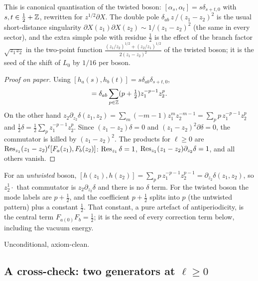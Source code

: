 \begin{physics}
This is canonical quantisation of the twisted boson: $[\alpha_s,\alpha_t]=s\delta_{s+t,0}$ with $s,t\in\tfrac12+{\mathbb{Z}}$, rewritten for $z^{1/2}\partial X$. The double pole $\delta_{ab}\,z\,/(z_1-z_2)^2$ is the usual short-distance singularity $\partial X(z_1)\partial X(z_2)\sim1/(z_1-z_2)^2$ (the same in every sector), and the extra simple pole with residue $\tfrac12$ is the effect of the branch factor $\sqrt{z_1z_2}$ in the two-point function $\frac{(z_1/z_2)^{1/2}+(z_2/z_1)^{1/2}}{2(z_1-z_2)^2}$ of the twisted boson; it is the seed of the shift of $L_0$ by $1/16$ per boson.
\end{physics}

\begin{proof}[Proof on paper]
Using $[h_a(s),h_b(t)] = s\delta_{ab}\delta_{s+t,0}$,
\begin{equation*}
  [F_a(z_1),F_b(z_2)] = \delta_{ab}\sum_{p\in\Z}(p+\tfrac12)z_1^{-p-1}z_2^{p}.
\end{equation*}
On the other hand $z_2\partial_{z_2}\delta(z_1,z_2) = \sum_m(-m-1)z_1^mz_2^{-m-1} =
\sum_p p\,z_1^{-p-1}z_2^{p}$ and $\frac12\delta = \frac12\sum_pz_1^{-p-1}z_2^p$. Since
$(z_1-z_2)\delta = 0$ and $(z_1-z_2)^2\partial\delta = 0$, the commutator is killed by
$(z_1-z_2)^2$. The products for $\ell\ge0$ are $\operatorname{Res}_{z_1}(z_1-z_2)^\ell[F_a(z_1),F_b(z_2)]$:
$\operatorname{Res}_{z_1}\delta = 1$, $\operatorname{Res}_{z_1}(z_1-z_2)\partial_{z_2}\delta = 1$, and all others vanish.
\end{proof}

\begin{remark}
For an \emph{untwisted} boson, $[h(z_1),h(z_2)] = \sum_p p\,z_1^{-p-1}z_2^{p-1} =
\partial_{z_2}\delta(z_1,z_2)$, so $z_2^{1}\cdot$ that commutator is $z_2\partial_{z_2}\delta$
and there is no $\delta$ term. For the twisted boson the mode labels are $p+\frac12$, and the
coefficient $p+\frac12$ splits into $p$ (the untwisted pattern) plus a constant $\frac12$. That
constant, a pure artefact of antiperiodicity, is the central term $F_{a(0)}F_b = \frac12$; it is
the seed of every correction term below, including the vacuum energy.
\end{remark}

\begin{status}
Unconditional, axiom-clean.
\end{status}

\subsection{A cross-check: two generators at \texorpdfstring{$\ell\ge0$}{l>=0}}
\label{ch07:sec:gencheck}

